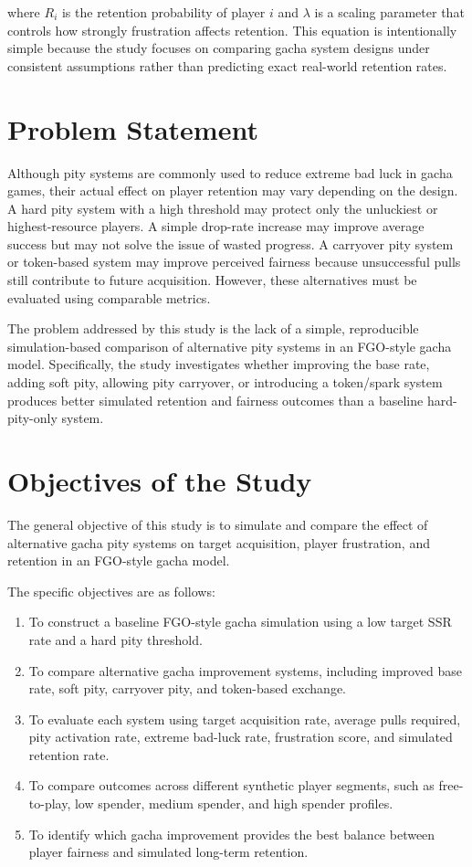 \documentclass[sigconf,nonacm]{acmart}
\begin{document}
where $R_i$ is the retention probability of player $i$ and $\lambda$ is a scaling parameter that controls how strongly frustration affects retention. This equation is intentionally simple because the study focuses on comparing gacha system designs under consistent assumptions rather than predicting exact real-world retention rates.

\section{Problem Statement}

Although pity systems are commonly used to reduce extreme bad luck in gacha games, their actual effect on player retention may vary depending on the design. A hard pity system with a high threshold may protect only the unluckiest or highest-resource players. A simple drop-rate increase may improve average success but may not solve the issue of wasted progress. A carryover pity system or token-based system may improve perceived fairness because unsuccessful pulls still contribute to future acquisition. However, these alternatives must be evaluated using comparable metrics.

The problem addressed by this study is the lack of a simple, reproducible simulation-based comparison of alternative pity systems in an FGO-style gacha model. Specifically, the study investigates whether improving the base rate, adding soft pity, allowing pity carryover, or introducing a token/spark system produces better simulated retention and fairness outcomes than a baseline hard-pity-only system.

\section{Objectives of the Study}

The general objective of this study is to simulate and compare the effect of alternative gacha pity systems on target acquisition, player frustration, and retention in an FGO-style gacha model.

The specific objectives are as follows:

\begin{enumerate}[label=\textbf{O\arabic*.}]
    \item To construct a baseline FGO-style gacha simulation using a low target SSR rate and a hard pity threshold.
    \item To compare alternative gacha improvement systems, including improved base rate, soft pity, carryover pity, and token-based exchange.
    \item To evaluate each system using target acquisition rate, average pulls required, pity activation rate, extreme bad-luck rate, frustration score, and simulated retention rate.
    \item To compare outcomes across different synthetic player segments, such as free-to-play, low spender, medium spender, and high spender profiles.
    \item To identify which gacha improvement provides the best balance between player fairness and simulated long-term retention.
\end{enumerate}
\end{document}
